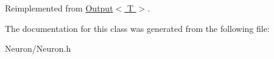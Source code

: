\-Reimplemented from \hyperlink{class_output_afd26f81d178846371c17d63015f2eb9f}{\-Output$<$ T $>$}.



\-The documentation for this class was generated from the following file\-:\begin{DoxyCompactItemize}
\item 
\-Neuron/\-Neuron.\-h\end{DoxyCompactItemize}
